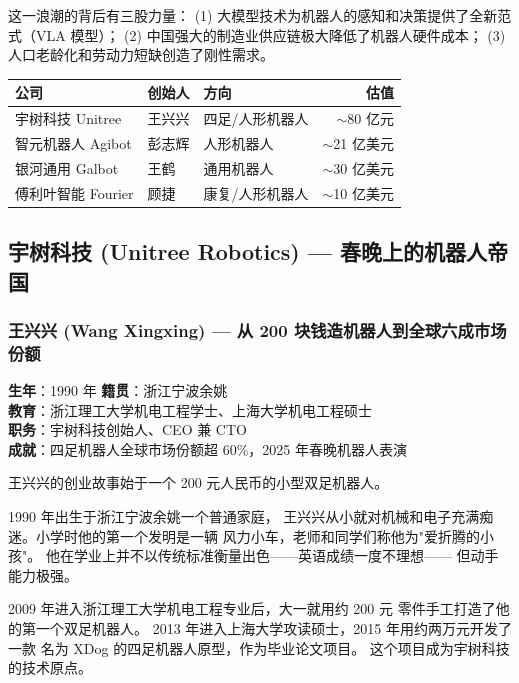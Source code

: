 这一浪潮的背后有三股力量：
(1) 大模型技术为机器人的感知和决策提供了全新范式（VLA 模型）；
(2) 中国强大的制造业供应链极大降低了机器人硬件成本；
(3) 人口老龄化和劳动力短缺创造了刚性需求。

\begin{corebox}[中国机器人创业公司一览（2026 年 3 月）]
\begin{tabular}{lllr}
\textbf{公司} & \textbf{创始人} & \textbf{方向} & \textbf{估值} \\
\hline
宇树科技 Unitree & 王兴兴 & 四足/人形机器人 & $\sim$80 亿元 \\
智元机器人 Agibot & 彭志辉 & 人形机器人 & $\sim$21 亿美元 \\
银河通用 Galbot & 王鹤 & 通用机器人 & $\sim$30 亿美元 \\
傅利叶智能 Fourier & 顾捷 & 康复/人形机器人 & $\sim$10 亿美元 \\
\end{tabular}
\end{corebox}


\subsection{宇树科技 (Unitree Robotics) — 春晚上的机器人帝国}

\subsubsection{王兴兴 (Wang Xingxing) — 从 200 块钱造机器人到全球六成市场份额}

\begin{keybox}
\textbf{生年}：1990 年 \quad \textbf{籍贯}：浙江宁波余姚 \\
\textbf{教育}：浙江理工大学机电工程学士、上海大学机电工程硕士 \\
\textbf{职务}：宇树科技创始人、CEO 兼 CTO \\
\textbf{成就}：四足机器人全球市场份额超 60\%，2025 年春晚机器人表演
\end{keybox}

王兴兴的创业故事始于一个 200 元人民币的小型双足机器人。

1990 年出生于浙江宁波余姚一个普通家庭，
王兴兴从小就对机械和电子充满痴迷。小学时他的第一个发明是一辆
风力小车，老师和同学们称他为"爱折腾的小孩"。
他在学业上并不以传统标准衡量出色——英语成绩一度不理想——
但动手能力极强。

2009 年进入浙江理工大学机电工程专业后，大一就用约 200 元
零件手工打造了他的第一个双足机器人。
2013 年进入上海大学攻读硕士，2015 年用约两万元开发了一款
名为 XDog 的四足机器人原型，作为毕业论文项目。
这个项目成为宇树科技的技术原点。

